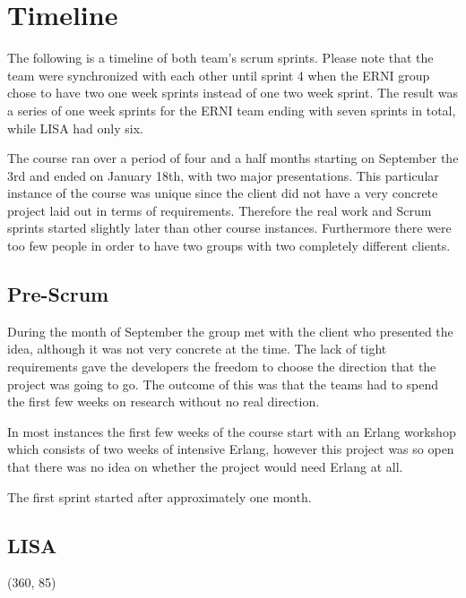 \section {Timeline}

The following is a timeline of both team's scrum sprints. Please note that the team were synchronized with each other until sprint 4 when the ERNI group chose to have two one week sprints instead of one two week sprint. The result was a series of one week sprints for the ERNI team ending with seven sprints in total, while LISA had only six.

The course ran over a period of four and a half months starting on September the 3rd and ended on January 18th, with two major presentations. This particular instance of the course was unique since the client did not have a very concrete project laid out in terms of requirements. Therefore the real work and Scrum sprints started slightly later than other course instances. Furthermore there were too few people in order to have two groups
with two completely different clients.

\subsection{Pre-Scrum}
During the month of September the group met with the client who presented the idea, although it was not very concrete at the time. The lack of tight requirements gave the developers the freedom to choose the direction that the project was going to go. The outcome of this was that the teams had to spend the first few weeks on research without no real direction. 

In most instances the first few weeks of the course start with an Erlang workshop which consists of two weeks of intensive Erlang, however this project was so open that there was no idea on whether the project would need Erlang at all.

The first sprint started after approximately one month.

\subsection {LISA}
\framebox(360, 85){
}


